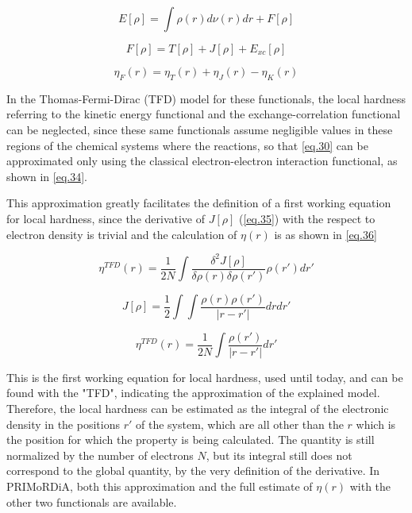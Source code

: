 \documentclass[a4paper,11pt]{refart}
\begin{document}
	\begin{equation}
	E[\rho] = \int \rho(r) d \nu (r) dr + F[\rho]
	\label{eq.31}
	\end{equation}

	\begin{equation}
	F[\rho] = T[\rho] + J[\rho] + E_{xc}[\rho]
	\label{eq.32}
	\end{equation}

	\begin{equation}
	\eta_{F} (r) = \eta_{T}(r)+ \eta_{J}(r) - \eta_{K}(r)
	\label{eq.33}
	\end{equation}

	In the Thomas-Fermi-Dirac (TFD) model for these functionals, the local hardness referring to the kinetic energy functional and the exchange-correlation functional can be neglected, since these same functionals assume negligible values in these regions of the chemical systems where the reactions, so that \autoref{eq.30} can be approximated only using the classical electron-electron interaction functional, as shown in \autoref{eq.34}. 

	This approximation greatly facilitates the definition of a first working equation for local hardness, since the derivative of $J[\rho]$ (\autoref{eq.35})  with the respect to electron density is trivial and the calculation of $\eta(r)$ is as shown in \autoref{eq.36}



	\begin{equation}
	\eta^{TFD} (r) = \frac{1}{2N} \int \frac{\delta^2 J[\rho]}{\delta \rho(r) \delta \rho(r')} \rho(r')dr'
	\label{eq.34}
	\end{equation}

	\begin{equation}
	J[\rho] = \frac{1}{2} \int \int \frac{\rho(r) \rho(r')}{|r-r'|} dr dr'
	\label{eq.35}
	\end{equation}

	\begin{equation}
	\eta^{TFD} (r) = \frac{1}{2N} \int \frac{\rho(r')}{|r-r'|} dr'
	\label{eq.36}
	\end{equation}

	This is the first working equation for local hardness, used until today, and can be found with the "TFD", indicating the approximation of the explained model. Therefore, the local hardness can be estimated as the integral of the electronic density in the positions $r'$ of the system, which are all other than the $r$ which is the position for which the property is being calculated. The quantity is still normalized by the number of electrons $N$, but its integral still does not correspond to the global quantity, by the very definition of the derivative. In PRIMoRDiA, both this approximation and the full estimate of $\eta(r)$ with the other two functionals are available.
\end{document}
